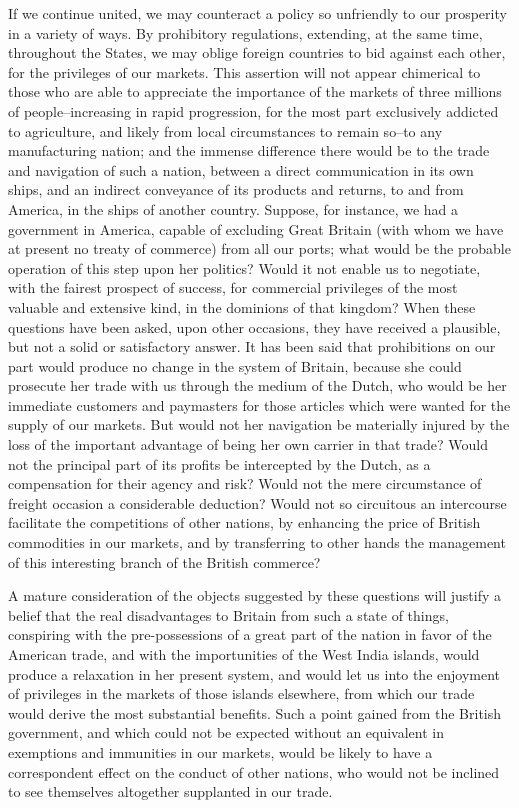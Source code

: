 If we continue united, we may counteract a policy so unfriendly to our prosperity in a variety of ways. 
By prohibitory regulations, extending, at the same time, throughout the States, we may oblige foreign countries to bid against each other, for the privileges of our markets. 
This assertion will not appear chimerical to those who are able to appreciate the importance of the markets of three millions of people--increasing in rapid progression, for the most part exclusively addicted to agriculture, and likely from local circumstances to remain so--to any manufacturing nation; and the immense difference there would be to the trade and navigation of such a nation, between a direct communication in its own ships, and an indirect conveyance of its products and returns, to and from America, in the ships of another country. 
Suppose, for instance, we had a government in America, capable of excluding Great Britain (with whom we have at present no treaty of commerce) from all our ports; what would be the probable operation of this step upon her politics? 
Would it not enable us to negotiate, with the fairest prospect of success, for commercial privileges of the most valuable and extensive kind, in the dominions of that kingdom? 
When these questions have been asked, upon other occasions, they have received a plausible, but not a solid or satisfactory answer. 
It has been said that prohibitions on our part would produce no change in the system of Britain, because she could prosecute her trade with us through the medium of the Dutch, who would be her immediate customers and paymasters for those articles which were wanted for the supply of our markets. 
But would not her navigation be materially injured by the loss of the important advantage of being her own carrier in that trade? 
Would not the principal part of its profits be intercepted by the Dutch, as a compensation for their agency and risk? 
Would not the mere circumstance of freight occasion a considerable deduction? 
Would not so circuitous an intercourse facilitate the competitions of other nations, by enhancing the price of British commodities in our markets, and by transferring to other hands the management of this interesting branch of the British commerce?

A mature consideration of the objects suggested by these questions will justify a belief that the real disadvantages to Britain from such a state of things, conspiring with the pre-possessions of a great part of the nation in favor of the American trade, and with the importunities of the West India islands, would produce a relaxation in her present system, and would let us into the enjoyment of privileges in the markets of those islands elsewhere, from which our trade would derive the most substantial benefits. 
Such a point gained from the British government, and which could not be expected without an equivalent in exemptions and immunities in our markets, would be likely to have a correspondent effect on the conduct of other nations, who would not be inclined to see themselves altogether supplanted in our trade.

